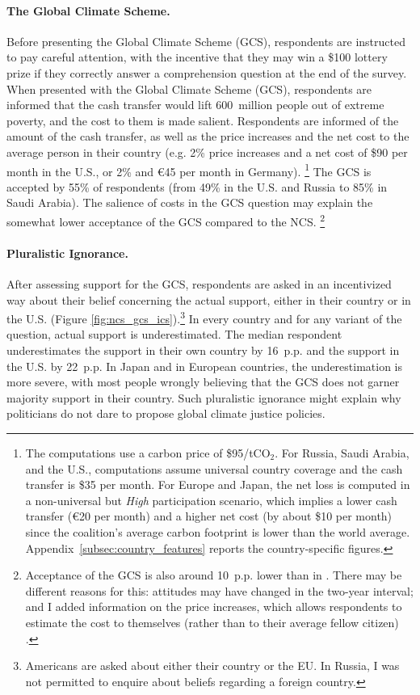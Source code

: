 \documentclass[12pt,english]{article}
\begin{document}
\begin{bibunit}
\paragraph{The Global Climate Scheme.}
Before presenting the Global Climate Scheme (GCS), respondents are instructed to pay careful attention, with the incentive that they may win a \$100 lottery prize if they correctly answer a comprehension question at the end of the survey.
When presented with the Global Climate Scheme (GCS), respondents are informed that the cash transfer would lift 600~million people out of extreme poverty, and the cost to them is made salient. Respondents are informed of the amount of the cash transfer, as well as the price increases and the net cost to the average person in their country (e.g. 2\% price increases and a net cost of \$90 per month in the U.S., or 2\% and \euro{}45 per month in Germany).%
\footnote{The computations use a carbon price of \$95/tCO$_\text{2}$. For Russia, Saudi Arabia, and the U.S., computations assume universal country coverage and the cash transfer is \$35 per month. 
For Europe and Japan, the net loss is computed in a non-universal but \textit{High} participation scenario, which implies a lower cash transfer (\euro{}20 per month) and a higher net cost (by about \$10 per month) since the coalition's average carbon footprint is lower than the world average. Appendix~\ref{subsec:country_features} reports the country-specific figures.} 
The GCS is accepted by 55\% of respondents (from 49\% in the U.S. and Russia to 85\% in Saudi Arabia). The salience of costs in the GCS question may explain the somewhat lower acceptance of the GCS compared to the NCS.%
\footnote{Acceptance of the GCS is also around 10~p.p. lower than in \cite{fabre_majority_2025}. There may be different reasons for this: attitudes may have changed in the two-year interval; and I added information on the price increases, which allows respondents to estimate the cost to themselves (rather than to their average fellow citizen)%
.} 

\paragraph{Pluralistic Ignorance.}
After assessing support for the GCS, respondents are asked in an incentivized way about their belief concerning the actual support, either in their country or in the U.S. (Figure \ref{fig:ncs_gcs_ics}).\footnote{Americans are asked about either their country or the EU. In Russia, I was not permitted to enquire about beliefs regarding a foreign country.}
In every country and for any variant of the question, actual support is underestimated. The median respondent underestimates the support in their own country by 16~p.p. and the support in the U.S. by 22~p.p. In Japan and in European countries, the underestimation is more severe, with most people wrongly believing that the GCS does not garner majority support in their country. Such pluralistic ignorance might explain why politicians do not dare to propose global climate justice policies.


\end{bibunit}
\end{document}
